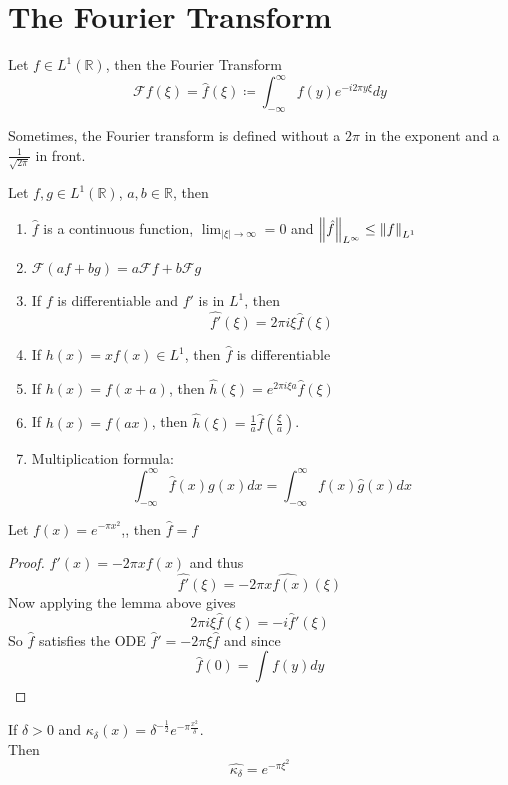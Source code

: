 \documentclass[../main.tex]{subfiles}
\begin{document}
\section{The Fourier Transform}
\begin{defn}
	Let $f\in L^{1}( \mathbb{R}) $, then the Fourier Transform
	\[ 
	\mathcal{F} f( \xi) = \hat{f}( \xi) \coloneqq \int_{ - \infty  }^{ \infty  } f( y) e^{- i 2 \pi y \xi} dy
	\]
\end{defn}
\begin{rmq}
Sometimes, the Fourier transform is defined without a $2\pi$ in the exponent and a $\frac{1}{ \sqrt{2\pi} }$ in front.
\end{rmq}
\begin{lemma}
	Let $f,g \in L^{1}( \mathbb{R}) $, $a,b \in \mathbb{R}$, then
\begin{enumerate}
\item $\hat{f}$ is a continuous function, $ \lim_{ |\xi| \to \infty }=0 $ and $ \left\lVert \hat{f}\right\rVert_{L^{ \infty }} \leq  \left\lVert f\right\rVert_{L^{1}} $ 
\item $ \mathcal{F}(  af + bg) = a \mathcal{F}f+ b \mathcal{F}g$ 
\item If $f$ is differentiable and $f'$ is in $L^{1}$, then
	\[ 
	\hat{f'}( \xi) =2\pi i \xi \hat{f}( \xi) 
	\]

\item If $h( x) = x f( x) \in L^{1}$, then $ \hat{f}$ is differentiable
\item If $h( x) = f( x+a) $, then $\hat{h}( \xi) = e^{2\pi i \xi a } \hat{f}( \xi) $ 
\item If $h( x) = f( ax)$, then $ \hat{h}( \xi) = \frac{1}{a} \hat{f}(  \frac{\xi}{a}) $.
\item Multiplication formula:
	\[ 
	\int_{ - \infty  }^{ \infty  } \hat{f}( x) g( x) dx = \int_{ - \infty  }^{ \infty  } f( x) \hat{g}( x) dx
	\]
	
\end{enumerate}
\end{lemma}
\begin{propo}
	Let $f( x) = e^{- \pi x^{2}} $,, then $\hat{f}= f $ 
\end{propo}
\begin{proof}
$f'( x) = - 2\pi  x f( x) $ and thus
\[ 
\hat{f'}( \xi) = -  2\pi \hat{ xf( x) }( \xi) 
\]
Now applying the lemma above gives
\[ 
2\pi i \xi \hat{f}( \xi) = -i  \hat{f}'( \xi) 
\]
So $\hat{f}$ satisfies the ODE $ \hat{f}' = - 2\pi \xi \hat{f}$ and since
\[ 
\hat{f}( 0)  = \int_{  }^{  } f( y) dy
\]
\end{proof}

\begin{crly}
If $\delta >0 $ and $\kappa_\delta ( x) = \delta ^{-\frac{1}{2}} e^{- \pi \frac{x^{2}}{\delta}} $.\\
Then 
\[ 
\hat{ \kappa_\delta}= e^{- \pi \xi ^{2}} 
\]

\end{crly}
\end{document}
